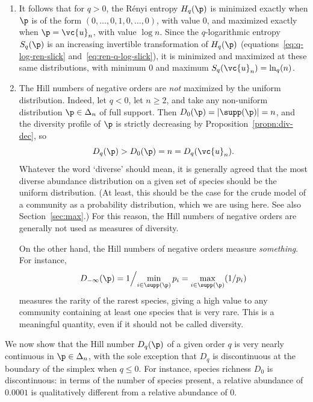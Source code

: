 \begin{remarks}
\begin{enumerate}
\item 
{}
It follows that for $q > 0$, the R\'enyi entropy $H_q(\p)$ is minimized
exactly when $\p$ is of the form $(0, \ldots, 0, 1, 0, \ldots, 0)$, with
value $0$, and maximized exactly when $\p = \vc{u}_n$, with value $\log n$.
Since the $q$-logarithmic entropy $S_q(\p)$ is an increasing invertible
transformation of $H_q(\p)$ (equations~\eqref{eq:q-log-ren-slick}
and~\eqref{eq:ren-q-log-slick}), it is minimized and maximized at these same
distributions, with minimum $0$ and maximum $ S_q(\vc{u}_n) = \ln_q(n)$.

\item
{}
% 
The Hill numbers of negative orders are \emph{not} maximized by the uniform
distribution.  Indeed, let $q < 0$, let $n \geq 2$, and take any non-uniform
distribution $\p \in \Delta_n$ of full support.
Then $D_0(\p) = |\supp(\p)| = n$, and the diversity profile of $\p$ is
strictly decreasing by Proposition~\ref{propn:div-dec}, so
\[
D_q(\p) > D_0(\p) = n = D_q(\vc{u}_n).
\]
Whatever the word `diverse' should mean, it is generally agreed that the
most diverse abundance distribution on a given set of species should be the
uniform distribution.  (At least, this should be the case for the crude
model of a community as a probability distribution, which we are using
here.  See also Section~\ref{sec:max}.)  For this reason, the Hill numbers
of negative orders are generally not used as measures of diversity.

On the other hand, the Hill numbers of negative orders measure
\emph{something}.  For instance, 
\[
D_{-\infty}(\p) = 1\Big/\!\min_{i \in \supp(\p)} p_i
= \max_{i \in \supp(\p)} (1/p_i)
\]
measures the rarity of the rarest species, giving a high value to any
community containing at least one species that is very rare.  This is a
meaningful quantity, even if it should not be called diversity.
\end{enumerate}
\end{remarks}

We now show that the Hill number $D_q(\p)$ of a given order $q$ is very
nearly continuous in $\p \in \Delta_n$, with the sole exception that $D_q$
is discontinuous at the boundary of the simplex when $q \leq 0$.  For
instance, species richness%
%
% 
$D_0$ is discontinuous: in terms of the number of species present, a
relative abundance of $0.0001$ is qualitatively different from a relative
abundance of $0$.

